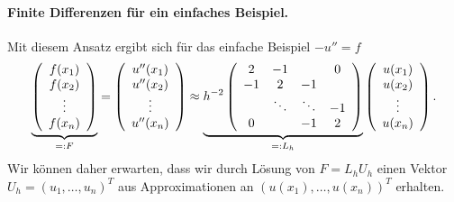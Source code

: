 \documentclass[
]{mycourse}
\theoremstyle{mythm}
\theoremstyle{break}
\begin{document}
\paragraph{Finite Differenzen für ein einfaches Beispiel.}
Mit diesem Ansatz ergibt sich für das einfache Beispiel $-u''=f$ 
\[
\underbrace{\left( \begin{array}{c} f(x_1)\\ f(x_2)\\ \vdots \\ f(x_{n}) \end{array}\right)}_{=:F}
= \left( \begin{array}{c} u''(x_1)\\ u''(x_2)\\ \vdots \\ u''(x_{n}) \end{array}\right)
\approx \underbrace{h^{-2} \left( \begin{array}{c c c c} 2 & -1 &  & 0\\ -1 & 2 & -1 \\ & \ddots & \ddots & -1\\ 0 & & -1 & 2\end{array}\right)}_{=:L_h}
\left( \begin{array}{c} u(x_1)\\ u(x_2)\\ \vdots \\ u(x_{n}) \end{array}\right).
\]
Wir können daher erwarten, dass wir durch Lösung von $F=L_h U_h$ einen
Vektor $U_h=(u_1,\ldots,u_{n})^T$ aus Approximationen an $(u(x_1),\ldots,u(x_{n}))^T$
erhalten.
\end{document}

